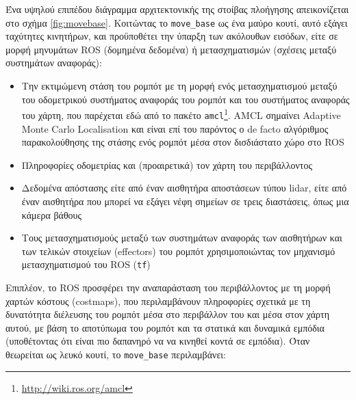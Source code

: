 Ένα υψηλού επιπέδου διάγραμμα αρχιτεκτονικής της στοίβας πλοήγησης
απεικονίζεται στο σχήμα \ref{fig:movebase}. Κοιτώντας το \texttt{move\_base} ως
ένα μαύρο κουτί, αυτό εξάγει ταχύτητες κινητήρων, και προϋποθέτει την ύπαρξη
των ακόλουθων εισόδων, είτε σε μορφή μηνυμάτων ROS (δομημένα δεδομένα) ή
μετασχηματισμών (σχέσεις μεταξύ συστημάτων αναφοράς):

\begin{itemize}
  \item Την εκτιμώμενη στάση του ρομπότ με τη μορφή ενός μετασχηματισμού μεταξύ
        του οδομετρικού συστήματος αναφοράς του ρομπότ και του συστήματος
        αναφοράς του χάρτη, που παρέχεται εδώ από το πακέτο
        \texttt{amcl}\footnote{\url{http://wiki.ros.org/amcl}}.
        AMCL σημαίνει Adaptive Monte Carlo Localisation
        \cite{Fox2001,Grisetti2007} και είναι επί του παρόντος ο de facto
        αλγόριθμος παρακολούθησης της στάσης ενός ρομπότ μέσα στον δισδιάστατο
        χώρο στο ROS
  \item Πληροφορίες οδομετρίας και (προαιρετικά) τον χάρτη του περιβάλλοντος
  \item Δεδομένα απόστασης είτε από έναν αισθητήρα αποστάσεων τύπου lidar, είτε
        από έναν αισθητήρα που μπορεί να εξάγει νέφη σημείων σε τρεις
        διαστάσεις, όπως μια κάμερα βάθους
  \item Τους μετασχηματισμούς μεταξύ των συστημάτων αναφοράς
        των αισθητήρων και των τελικών στοιχείων (effectors) του ρομπότ
        χρησιμοποιώντας τον μηχανισμό μετασχηματισμού του ROS (\texttt{tf})
\end{itemize}

Επιπλέον, το ROS προσφέρει την αναπαράσταση του περιβάλλοντος με τη μορφή
χαρτών κόστους (costmaps), που περιλαμβάνουν πληροφορίες σχετικά με τη
δυνατότητα διέλευσης του ρομπότ μέσα στο περιβάλλον του και μέσα στον χάρτη
αυτού, με βάση το αποτύπωμα του ρομπότ και τα στατικά και δυναμικά εμπόδια
(υποθέτοντας ότι είναι πιο δαπανηρό να να κινηθεί κοντά σε εμπόδια). Όταν
θεωρείται ως λευκό κουτί, το \texttt{move\_base} περιλαμβάνει:

